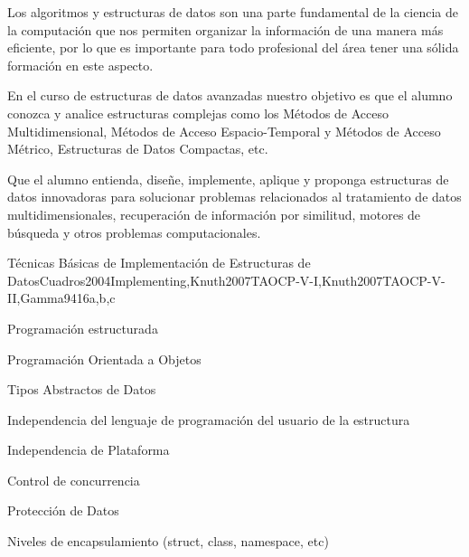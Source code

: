 \begin{syllabus}


\begin{justification}
Los algoritmos y estructuras de datos son una parte fundamental de la ciencia de la computación que nos 
permiten organizar la información de una manera más eficiente, por lo que es importante para todo 
profesional del área tener una sólida formación en este aspecto.

En el curso de estructuras de datos avanzadas nuestro objetivo es que el alumno conozca y analice 
estructuras complejas como los Métodos de Acceso Multidimensional, 
Métodos de Acceso Espacio-Temporal y 
Métodos de Acceso Métrico, Estructuras de Datos Compactas, etc.
\end{justification}

\begin{goals}
\item Que el alumno entienda, diseñe, implemente, aplique y
proponga estructuras de datos innovadoras para solucionar
problemas relacionados al tratamiento de datos multidimensionales,
recuperación de información por similitud, motores de búsqueda y
otros problemas computacionales.
\end{goals}

\begin{outcomes}
\end{outcomes}

\begin{competences}
    \item {} 
    \item {} 
\end{competences}

\begin{unit}{Técnicas Básicas de Implementación de Estructuras de Datos}{Cuadros2004Implementing,Knuth2007TAOCP-V-I,Knuth2007TAOCP-V-II,Gamma94}{16}{a,b,c}
   \begin{topics}
         \item Programación estructurada
         \item Programación Orientada a Objetos
         \item Tipos Abstractos de Datos
         \item Independencia del lenguaje de programación del usuario de la estructura
         \item Independencia de Plataforma
         \item Control de concurrencia
         \item Protección de Datos
         \item Niveles de encapsulamiento (struct, class, namespace, etc)
   \end{topics}


\end{unit}
\end{syllabus}
